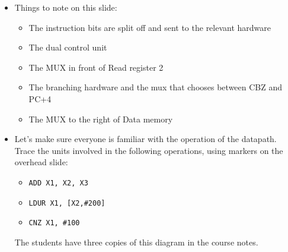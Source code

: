 \begin{frame}[fragile]


\goodbreak

\begin{minipage}{\textwidth}
	\vspace*{0.5in}{\tt LDUR X1, [X1,\#200]}

\end{minipage}

\goodbreak

\begin{minipage}{\textwidth}
	\vspace*{0.5in}{\tt CBZ X1, \#100}

\end{minipage}

\BNotes\ifnum{}
\begin{itemize}
\item Things to note on this slide:
\begin{itemize}
	\item The instruction bits are split off and sent to the
		relevant hardware
	\item The dual control unit
	\item The MUX in front of Read register 2
	\item The branching hardware and the mux that chooses between
		CBZ and PC+4
	\item The MUX to the right of Data memory
\end{itemize}
\item Let's
make sure everyone is familiar with the operation of the
datapath. Trace the units involved in the following operations, using
markers on the overhead slide:
\begin{itemize}
\item {\tt ADD X1, X2, X3}
\item {\tt LDUR X1, [X2,\#200]}
\item {\tt CNZ X1, \#100}
\end{itemize}
	The students have three copies of this diagram in the course notes.
\end{itemize}
\fi\ENotes
\end{frame}

